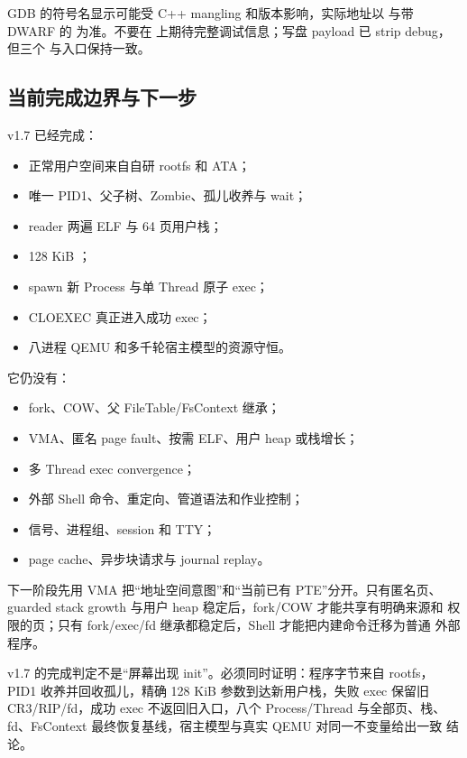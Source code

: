 GDB 的符号名显示可能受 C++ mangling 和版本影响，实际地址以
 与带 DWARF 的  为准。不要在
 上期待完整调试信息；写盘 payload 已 strip
debug，但三个  与入口保持一致。

\subsection{当前完成边界与下一步}

v1.7 已经完成：

\begin{itemize}
  \item 正常用户空间来自自研 rootfs 和 ATA；
  \item 唯一 PID1、父子树、Zombie、孤儿收养与 wait；
  \item reader 两遍 ELF 与 64 页用户栈；
  \item 128 KiB ；
  \item spawn 新 Process 与单 Thread 原子 exec；
  \item CLOEXEC 真正进入成功 exec；
  \item 八进程 QEMU 和多千轮宿主模型的资源守恒。
\end{itemize}

它仍没有：

\begin{itemize}
  \item fork、COW、父 FileTable/FsContext 继承；
  \item VMA、匿名 page fault、按需 ELF、用户 heap 或栈增长；
  \item 多 Thread exec convergence；
  \item 外部 Shell 命令、重定向、管道语法和作业控制；
  \item 信号、进程组、session 和 TTY；
  \item page cache、异步块请求与 journal replay。
\end{itemize}

下一阶段先用 VMA 把“地址空间意图”和“当前已有 PTE”分开。只有匿名页、
guarded stack growth 与用户 heap 稳定后，fork/COW 才能共享有明确来源和
权限的页；只有 fork/exec/fd 继承都稳定后，Shell 才能把内建命令迁移为普通
外部程序。

\begin{contractbox}
v1.7 的完成判定不是“屏幕出现 init”。必须同时证明：程序字节来自 rootfs，
PID1 收养并回收孤儿，精确 128 KiB 参数到达新用户栈，失败 exec 保留旧
CR3/RIP/fd，成功 exec 不返回旧入口，八个 Process/Thread 与全部页、栈、
fd、FsContext 最终恢复基线，宿主模型与真实 QEMU 对同一不变量给出一致
结论。
\end{contractbox}

